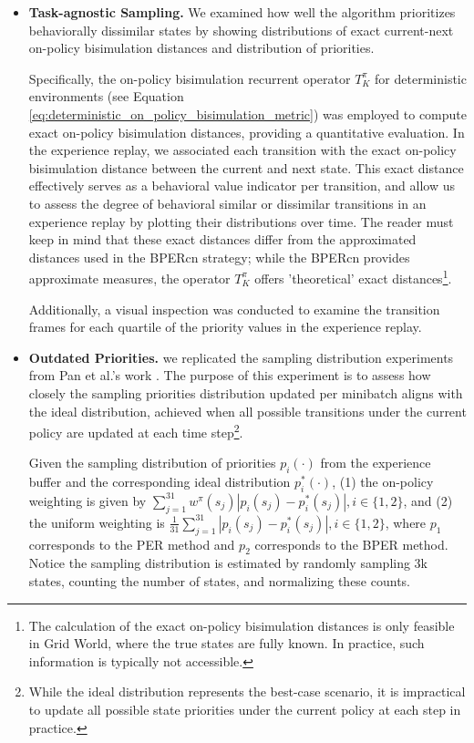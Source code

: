 \begin{itemize}
    \item \textbf{Task-agnostic Sampling.} We examined how well the algorithm prioritizes behaviorally dissimilar states by showing distributions of exact current-next on-policy bisimulation distances and distribution of priorities.

    Specifically, the on-policy bisimulation recurrent operator $T_K^\pi$ for deterministic environments (see Equation \ref{eq:deterministic_on_policy_bisimulation_metric}) was employed to compute exact on-policy bisimulation distances, providing a quantitative evaluation. In the experience replay, we associated each transition with the exact on-policy bisimulation distance between the current and next state. This exact distance effectively serves as a behavioral value indicator per transition, and allow us to assess the degree of behavioral similar or dissimilar transitions in an experience replay by plotting their distributions over time. The reader must keep in mind that these exact distances differ from the approximated distances used in the BPERcn strategy; while the BPERcn provides approximate measures, the operator $T_K^\pi$ offers 'theoretical' exact distances\footnote{The calculation of the exact on-policy bisimulation distances is only feasible in Grid World, where the true states are fully known. In practice, such information is typically not accessible.}.

    Additionally, a visual inspection was conducted to examine the transition frames for each quartile of the priority values in the experience replay.

    \item \textbf{Outdated Priorities.} we replicated the sampling distribution experiments from Pan et al.'s work \cite{pan2022understanding}. The purpose of this experiment is to assess how closely the sampling priorities distribution updated per minibatch aligns with the ideal distribution, achieved when all possible transitions under the current policy are updated at each time step\footnote{While the ideal distribution represents the best-case scenario, it is impractical to update all possible state priorities under the current policy at each step in practice.}. %

    Given the sampling distribution of priorities \(p_i(\cdot)\) from the experience buffer and the corresponding ideal distribution \(p_i^*(\cdot)\), (1) the on-policy weighting is given by \(\sum_{j=1}^{31} w^\pi(s_j) | p_i(s_j) -p_i^*(s_j)|, i \in \{1,2\}\), and (2) the uniform weighting is \(\frac{1}{31} \sum_{j=1}^{31} | p_i(s_j) -p_i^*(s_j) |, i \in \{1,2\}\), where \(p_1\) corresponds to the PER method and \(p_2\) corresponds to the BPER method. Notice the sampling distribution is estimated by randomly sampling 3k states, counting the number of states, and normalizing these counts.
    

\end{itemize}

